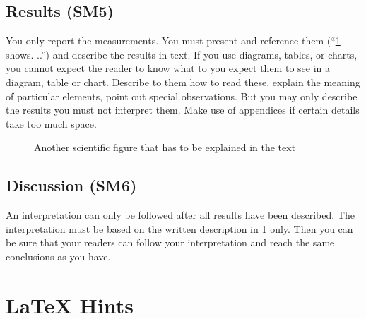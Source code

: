 \documentclass[
  numbers=noenddot,
  english,  %
  a4paper,  %
  twoside,  %
  bibliography=totoc,
  headsepline,
  cleardoublepage=empty,
  parskip=half,
  draft=false
]{scrbook}
\theoremstyle{break}
\begin{document}
\section{Results (SM5)}\label{sec:evaluation:results}

You only report the measurements.
You must present and reference them (``\cref{fig:my_label2} shows.
..'') and describe the results in text.
If you use diagrams, tables, or charts, you cannot expect the reader to know what to you expect them to see in a diagram, table or chart.
Describe to them how to read these, explain the meaning of particular elements, point out special observations.
But you may only describe the results you must not interpret them.
Make use of appendices if certain details take too much space.

\begin{figure}
  \centering
  \caption{Another scientific figure that has to be explained in the text}
  \label{fig:my_label2}
\end{figure}

\section{Discussion (SM6)}\label{sec:evaluation:discussion}

An interpretation can only be followed after all results have been described.
The interpretation must be based on the written description in \cref{sec:evaluation:results} only.
Then you can be sure that your readers can follow your interpretation and reach the same conclusions as you have.


\chapter{LaTeX Hints}
\label{sec:latexhints}

\newcount\LTGbeginlineexample
\newcount\LTGendlineexample
\newenvironment{ltgexample}%
{\LTGbeginlineexample=\numexpr\inputlineno+1\relax}%
{\LTGendlineexample=\numexpr\inputlineno-1\relax%
  \tcbinputlisting{%
    listing only,
    listing file=\currfilepath,
    colback=green!5!white,
    colframe=green!25,
    coltitle=black!90,
    coltext=black!90,
    left=8mm,
    title=Corresponding \LaTeX{} code of \texttt{\currfilepath},
    listing options={
        frame=none,
        language={[LaTeX]TeX},
        escapeinside={},
        firstline=\the\LTGbeginlineexample,
        lastline=\the\LTGendlineexample,
        firstnumber=\the\LTGbeginlineexample,
        basewidth=.5em,
        aboveskip=0mm,
        belowskip=0mm,
        numbers=left,
        xleftmargin=0mm,
        numberstyle=\tiny,
        numbersep=8pt%
      }
  }
}%
\end{document}
